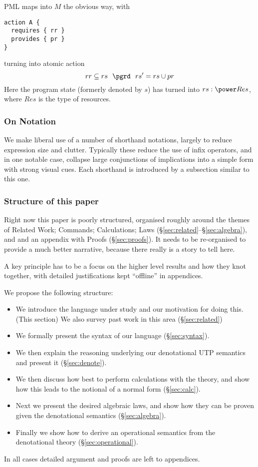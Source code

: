 PML maps into $M$ the obvious way,
with
\begin{verbatim}
action A {
  requires { rr }
  provides { pr }
}
\end{verbatim}
turning into atomic action
\[
rr \subseteq rs ~~\pgrd~~ rs' = rs \cup pr
\]
Here the program state (formerly denoted by $s$)
has turned into $rs:\power Res$, where $Res$ is the type of resources.

\subsubsection{On Notation}

We make liberal use of a number of shorthand notations,
largely to reduce expression size and clutter.
Typically these reduce the use of infix operators,
and in one notable case, collapse large conjunctions
of implications into a simple form with strong visual cues.
Each shorthand is introduced by a subsection similar to this one.

\subsubsection{Structure of this paper}

Right now this paper is poorly structured,
organised roughly around the themes of
Related Work;
Commands;
Calculations;
Laws (\S\ref{sec:related}--\S\ref{sec:algebra}),
and and an appendix with Proofs (\S\ref{sec:proofs}).
It needs to be re-organised to provide a much better narrative,
because there really is a story to tell here.

A key principle has to be a focus on the higher level results and how
they knot together,
with detailed justifications kept ``offline'' in appendices.

We propose the following structure:
\begin{itemize}
  \item
     We introduce the language under study and our motivation for doing this.
     (This section)
     We also survey past work in this area (\S\ref{sec:related})
  \item
    We formally present the syntax of our language (\S\ref{sec:syntax}).
  \item
     We then explain the reasoning underlying our denotational
     UTP semantics and present it (\S\ref{sec:denote}).
  \item
     We then discuss how best to perform calculations with the theory,
     and show how this leads to the notional of a normal form
     (\S\ref{sec:calc}).
  \item
     Next we present the desired algebraic laws,
     and show how they can be proven given the denotational semantics
     (\S\ref{sec:algebra}).
  \item
     Finally we show how to derive an operational semantics from
     the denotational theory
     (\S\ref{sec:operational}).
\end{itemize}
In all cases detailed argument and proofs are left to appendices.
